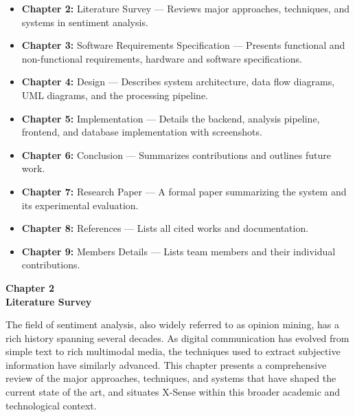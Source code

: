 \documentclass[12pt, a4paper]{report}
\begin{document}
\begin{itemize}[noitemsep, leftmargin=1.5em]
    \item \textbf{Chapter 2:} Literature Survey --- Reviews major approaches, techniques, and systems in sentiment analysis.
    \item \textbf{Chapter 3:} Software Requirements Specification --- Presents functional and non-functional requirements, hardware and software specifications.
    \item \textbf{Chapter 4:} Design --- Describes system architecture, data flow diagrams, UML diagrams, and the processing pipeline.
    \item \textbf{Chapter 5:} Implementation --- Details the backend, analysis pipeline, frontend, and database implementation with screenshots.
    \item \textbf{Chapter 6:} Conclusion --- Summarizes contributions and outlines future work.
    \item \textbf{Chapter 7:} Research Paper --- A formal paper summarizing the system and its experimental evaluation.
    \item \textbf{Chapter 8:} References --- Lists all cited works and documentation.
    \item \textbf{Chapter 9:} Members Details --- Lists team members and their individual contributions.
\end{itemize}

\newpage
\thispagestyle{empty}

\vspace*{\fill}
\begin{center}
{\Huge \textbf{Chapter 2}}\\[1cm]
{\Huge \textbf{Literature Survey}}
\end{center}
\vspace*{\fill}

\newpage

The field of sentiment analysis, also widely referred to as opinion mining, has a rich history spanning several decades. As digital communication has evolved from simple text to rich multimodal media, the techniques used to extract subjective information have similarly advanced. This chapter presents a comprehensive review of the major approaches, techniques, and systems that have shaped the current state of the art, and situates X-Sense within this broader academic and technological context.
\end{document}
